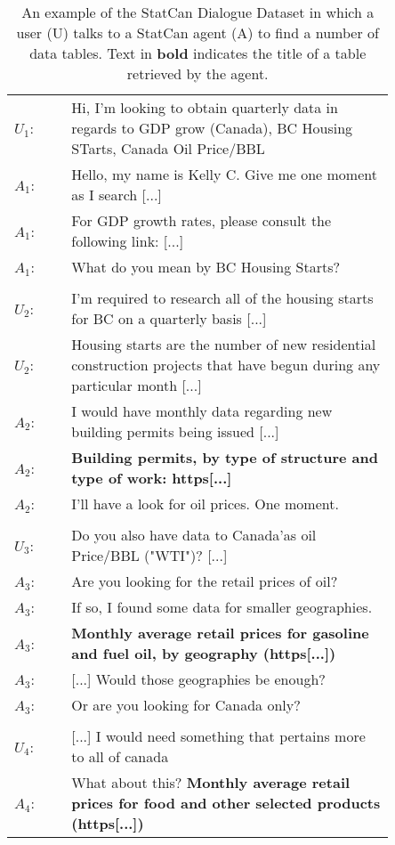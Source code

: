 \documentclass[11pt]{article}
\begin{document}
\begin{table}[h!]
    \small
    \centering
    \begin{tabular}{l p{0.85\linewidth}}
    \toprule
    $U_1$:  & Hi, I'm looking to obtain quarterly data in regards to GDP grow (Canada), BC Housing STarts, Canada Oil Price/BBL\\
    $A_1$: & Hello, my name is Kelly C. Give me one moment as I search [...]\\ 
    $A_1$: & For GDP growth rates, please consult the following link: [...]\\
    $A_1$: & What do you mean by BC Housing Starts?\\
    \\
    $U_2$: & I'm required to research all of the housing starts for BC on a quarterly basis [...]\\
    $U_2$: & Housing starts are the number of new residential construction projects that have begun during any particular month [...]\\
    $A_2$: & I would have monthly data regarding new building permits being issued [...] \\ 
    $A_2$: & \textbf{Building permits, by type of structure and type of work: https[...]}\\
    $A_2$: & I'll have a look for oil prices. One moment.\\
    \\
    $U_3$: & Do you also have data to Canada'as oil Price/BBL ("WTI")? [...]\\
    $A_3$: & Are you looking for the retail prices of oil?\\
    $A_3$: & If so, I found some data for smaller geographies.\\
    $A_3$: & \textbf{Monthly average retail prices for gasoline and fuel oil, by geography (https[...])}\\
    $A_3$: & [...] Would those geographies be enough?\\
    $A_3$: & Or are you looking for Canada only?\\
    \\
    $U_4$: & [...] I would need something that pertains more to all of canada\\
    $A_4$: & What about this? \textbf{Monthly average retail prices for food and other selected products (https[...])}\\
    \bottomrule
    \end{tabular}
    \caption{An example of the StatCan Dialogue Dataset in which a user (U) talks to a StatCan agent (A) to find a number of data tables.  Text in \textbf{bold} indicates the title of a table retrieved by the agent.
    }
    \label{tab:selected_example_conversation}
    \vspace{-3mm}
\end{table}
\end{document}
